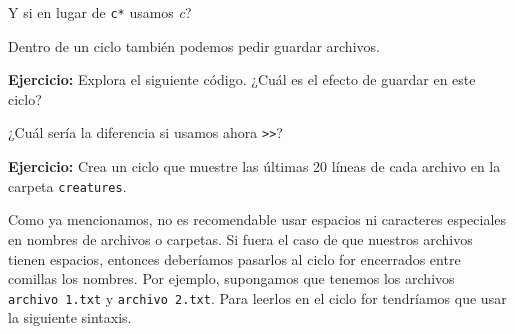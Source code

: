 \documentclass[
]{book}
\newenvironment{Shaded}{\begin{snugshade}}{\end{snugshade}}
\newcommand{\AttributeTok}[1]{\textcolor[rgb]{0.13,0.29,0.53}{#1}}
\newcommand{\ExtensionTok}[1]{#1}
\newcommand{\FunctionTok}[1]{\textcolor[rgb]{0.13,0.29,0.53}{\textbf{#1}}}
\newcommand{\KeywordTok}[1]{\textcolor[rgb]{0.13,0.29,0.53}{\textbf{#1}}}
\newcommand{\NormalTok}[1]{#1}
\newcommand{\OperatorTok}[1]{\textcolor[rgb]{0.81,0.36,0.00}{\textbf{#1}}}
\newcommand{\PreprocessorTok}[1]{\textcolor[rgb]{0.56,0.35,0.01}{\textit{#1}}}
\newcommand{\StringTok}[1]{\textcolor[rgb]{0.31,0.60,0.02}{#1}}
\newcommand{\VariableTok}[1]{\textcolor[rgb]{0.00,0.00,0.00}{#1}}
\begin{document}
\begin{Shaded}
\end{Shaded}

Y si en lugar de \texttt{c*} usamos \emph{c}?

Dentro de un ciclo también podemos pedir guardar archivos.

\textbf{Ejercicio:} Explora el siguiente código. ¿Cuál es el efecto de guardar en este ciclo?

\begin{Shaded}
\end{Shaded}

¿Cuál sería la diferencia si usamos ahora \texttt{\textgreater{}\textgreater{}}?

\textbf{Ejercicio:} Crea un ciclo que muestre las últimas 20 líneas de cada archivo en la carpeta \texttt{creatures}.

Como ya mencionamos, no es recomendable usar espacios ni caracteres especiales en nombres de archivos o carpetas. Si fuera el caso de que nuestros archivos tienen espacios, entonces deberíamos pasarlos al ciclo for encerrados entre comillas los nombres. Por ejemplo, supongamos que tenemos los archivos \texttt{archivo\ 1.txt} y \texttt{archivo\ 2.txt}. Para leerlos en el ciclo for tendríamos que usar la siguiente sintaxis.

\begin{Shaded}
\end{Shaded}
\end{document}
